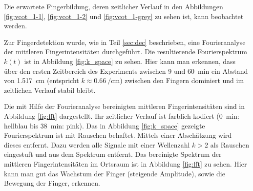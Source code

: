 Die erwartete Fingerbildung, deren zeitlicher Verlauf in den Abbildungen \ref{fig:vcot_1-1}, \ref{fig:vcot_1-2} und \ref{fig:vcot_1-grey} zu sehen ist, kann beobachtet werden.




Zur Fingerdetektion wurde, wie in Teil \ref{sec:dec} beschrieben, eine Fourieranalyse der mittleren Fingerintensitäten durchgeführt. Die resultierende Fourierspektrum $k(t)$ ist in Abbildung \ref{fig:k_space} zu sehen. Hier kann man erkennen, dass über den ersten Zeitbereich des Experiments zwischen 9 und \SI{60}{\minute} ein Abstand von \SI[round-precision=2]{1,517}{\centi\meter} (entspricht $k \approx \SI[round-precision=2]{0,66}{\per\centi\meter}$) zwischen den Fingern dominiert und im zeitlichen Verlauf stabil bleibt. 

Die mit Hilfe der Fourieranalyse bereinigten mittleren Fingerintensitäten sind in Abbildung \ref{fig:fft} dargestellt. Ihr zeitlicher Verlauf ist farblich kodiert (\SI{0}{\minute}: hellblau bis \mbox{\SI{38}{\minute}}: pink).  
Das in Abbildung \ref{fig:k_space} gezeigte Fourierspektrum ist mit Rauschen behaftet. Mittels einer Abschätzung wird dieses entfernt. Dazu werden alle Signale mit einer Wellenzahl $k > 2$ als Rauschen eingestuft und aus dem Spektrum entfernt. Das bereinigte Spektrum der mittleren Fingerintensitäten im Ortsraum ist in Abbildung \ref{fig:fft} zu sehen.
Hier kann man gut das Wachstum der Finger (steigende Amplitude), sowie die Bewegung der Finger, erkennen. %



